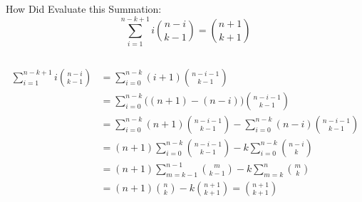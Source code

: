 % 

\begin{frame}{}
  \begin{exampleblock}{How Did  Evaluate this Summation:}
    \[
      \sum_{i=1}^{n-k+1} i \binom{n-i}{k-1} = \binom{n+1}{k+1}
    \]
  \end{exampleblock}

  \vspace{0.30cm}
  \begin{columns}
  \end{columns}

\end{frame}

\begin{frame}{}
  \begin{align*}
    \sum_{i=1}^{n-k+1} i \binom{n-i}{k-1} &= \sum_{i=0}^{n-k} (i+1) \binom{n-i-1}{k-1} \\
    &= \sum_{i=0}^{n-k} \big((n+1) - (n-i)\big) \binom{n-i-1}{k-1} \\
    &= \sum_{i=0}^{n-k} (n+1) \binom{n-i-1}{k-1} - \sum_{i=0}^{n-k} (n-i) \binom{n-i-1}{k-1} \\
    &= (n+1) \sum_{i=0}^{n-k}\binom{n-i-1}{k-1} - k \sum_{i=0}^{n-k} \binom{n-i}{k} \\
    &= (n+1) \sum_{m=k-1}^{n-1}\binom{m}{k-1} - k \sum_{m=k}^{n} \binom{m}{k} \\
    &= (n+1) \binom{n}{k} - k \binom{n+1}{k+1} = \binom{n+1}{k+1}
  \end{align*}
\end{frame}

